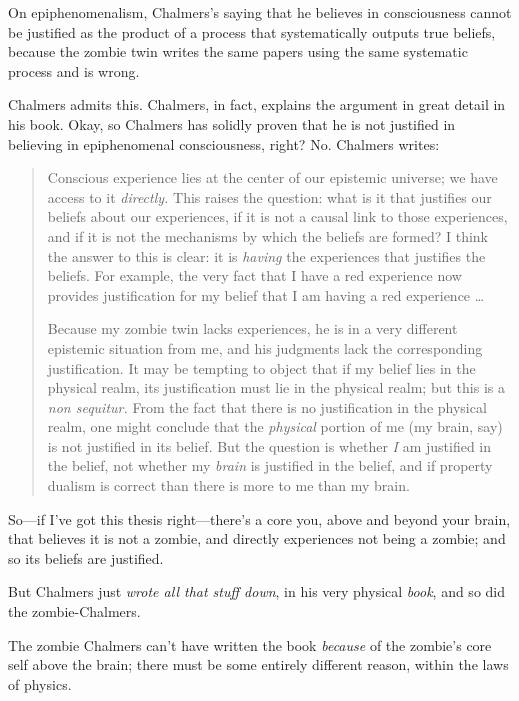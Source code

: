 {
 On epiphenomenalism, Chalmers's saying that he
believes in consciousness cannot be justified as the product of a
process that systematically outputs true beliefs, because the zombie
twin writes the same papers using the same systematic process and is
wrong.}

{
 Chalmers admits this. Chalmers, in fact, explains the argument in
great detail in his book. Okay, so Chalmers has solidly proven that he
is not justified in believing in epiphenomenal consciousness, right?
No. Chalmers writes:}

\begin{quotation}
{
 Conscious experience lies at the center of our epistemic universe;
we have access to it \textit{directly.} This raises the question: what
is it that justifies our beliefs about our experiences, if it is not a
causal link to those experiences, and if it is not the mechanisms by
which the beliefs are formed? I think the answer to this is clear: it
is \textit{having} the experiences that justifies the beliefs. For
example, the very fact that I have a red experience now provides
justification for my belief that I am having a red experience \ldots}

{
 Because my zombie twin lacks experiences, he is in a very
different epistemic situation from me, and his judgments lack the
corresponding justification. It may be tempting to object that if my
belief lies in the physical realm, its justification must lie in the
physical realm; but this is a \textit{non sequitur.} From the fact that
there is no justification in the physical realm, one might conclude
that the \textit{physical} portion of me (my brain, say) is not
justified in its belief. But the question is whether \textit{I} am
justified in the belief, not whether my \textit{brain} is justified in
the belief, and if property dualism is correct than there is more to me
than my brain.}

\end{quotation}
{
 So---if I've got this thesis
right---there's a core you, above and beyond your
brain, that believes it is not a zombie, and directly experiences not
being a zombie; and so its beliefs are justified.}

{
 But Chalmers just \textit{wrote all that stuff down}, in his very
physical \textit{book}, and so did the zombie-Chalmers.}

{
 The zombie Chalmers can't have written the book
\textit{because} of the zombie's core self above the
brain; there must be some entirely different reason, within the laws of
physics.}

